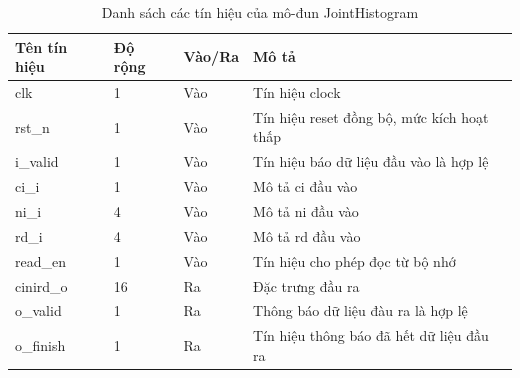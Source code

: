\begin{table}[!ht]
    \centering
    \renewcommand{\arraystretch}{1.3} %
        \caption{Danh sách các tín hiệu của mô-đun JointHistogram}
    \begin{tabular}{|p{3cm} p{2cm} p{2cm} p{8cm}|}
        \hline
        \rowcolor{gray!30}
        \textbf{Tên tín hiệu} & \textbf{Độ rộng} & \textbf{Vào/Ra} & \textbf{Mô tả} \\
        \hline
        clk & 1 & Vào & Tín hiệu clock \\
        \hline
        rst\_n & 1 & Vào & Tín hiệu reset đồng bộ, mức kích hoạt thấp \\
        \hline
        i\_valid & 1 & Vào & Tín hiệu báo dữ liệu đầu vào là hợp lệ \\
        \hline
        ci\_i & 1 & Vào & Mô tả ci đầu vào
        \\ \hline
        ni\_i & 4 & Vào & Mô tả ni đầu vào
        \\ \hline
        rd\_i & 4 & Vào & Mô tả rd đầu vào
        \\ \hline
        read\_en & 1 & Vào & Tín hiệu cho phép đọc từ bộ nhớ
        \\ \hline
        cinird\_o & 16 & Ra & Đặc trưng đầu ra
        \\ \hline
        o\_valid & 1 & Ra & Thông báo dữ liệu đàu ra là hợp lệ
        \\ \hline
        o\_finish & 1 & Ra & Tín hiệu thông báo đã hết dữ liệu đầu ra
        \\
        \hline
    \end{tabular}

    \label{tab:signalListJointHistogram}
\end{table}